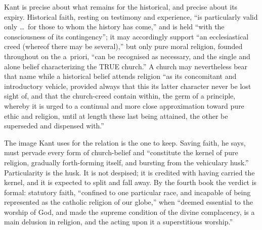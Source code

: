 Kant is precise about what remains for the historical, and precise about its expiry. Historical faith, resting on testimony and experience, ``is particularly valid only \ldots\ for those to whom the history has come,'' and is held ``with the consciousness of its contingency''; it may accordingly support ``an ecclesiastical creed (whereof there may be several),'' but only pure moral religion, founded throughout on the a~priori, ``can be recognised as necessary, and the single and alone belief characterizing the TRUE church.'' A church may nevertheless bear that name while a historical belief attends religion ``as its concomitant and introductory vehicle, provided always that this its latter character never be lost sight of, and that the church-creed contain within, the germ of a principle, whereby it is urged to a continual and more close approximation toward pure ethic and religion, until at length these last being attained, the other be superseded and dispensed with.''

The image Kant uses for the relation is the one to keep. Saving faith, he says, must pervade every form of church-belief and ``constitute the kernel of pure religion, gradually forth-forming itself, and bursting from the vehiculary husk.'' Particularity is the husk. It is not despised; it is credited with having carried the kernel, and it is expected to split and fall away. By the fourth book the verdict is formal: statutory faith, ``confined to one particular race, and incapable of being represented as the catholic religion of our globe,'' when ``deemed essential to the worship of God, and made the supreme condition of the divine complacency, is a main delusion in religion, and the acting upon it a superstitious worship.''

